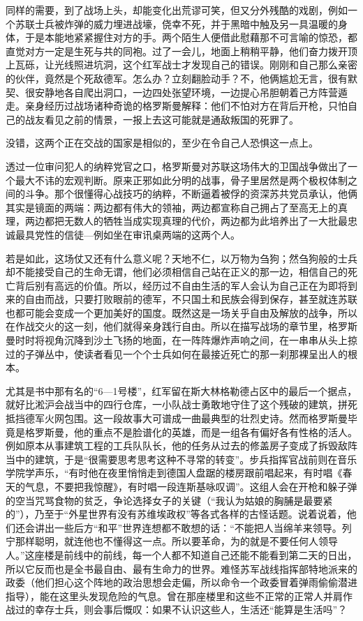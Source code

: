 同样的需要，到了战场上头，却能变化出荒谬可笑，但又分外残酷的戏剧，例如一个苏联士兵被炸弹的威力埋进战壕，侥幸不死，并于黑暗中触及另一具温暖的身体，于是本能地紧紧握住对方的手。两个陌生人便借此慰藉那不可言喻的惊恐，都直觉对方一定是生死与共的同袍。过了一会儿，地面上稍稍平静，他们奋力拨开顶上瓦砾，让光线照进坑洞，这个红军战士才发现自己的错误。刚刚和自己那么亲密的伙伴，竟然是个死敌德军。怎么办？立刻翻脸动手？不，他俩尴尬无言，很有默契、很安静地各自爬出洞口，一边四处张望环境，一边提心吊胆朝着己方阵营遁走。亲身经历过战场诸种奇诡的格罗斯曼解释：他们不怕对方在背后开枪，只怕自己的战友看见之前的情景，一报上去这可能就是通敌叛国的死罪了。

没错，这两个正在交战的国家是相似的，至少在令自己人恐惧这一点上。

透过一位审问犯人的纳粹党官之口，格罗斯曼对苏联这场伟大的卫国战争做出了一个最大不讳的宏观判断。原来正邪如此分明的战事，骨子里居然是两个极权体制之间的斗争。那个很懂得心战技巧的纳粹，不断逼着被俘的资深苏共党员承认，他俩其实是镜面的两端：两边都有伟大的领袖，两边都宣称自己拥占了至高无上的真理，两边都把无数人的牺牲当成实现真理的代价，两边都为此培养出了一大批最忠诚最具党性的信徒—例如坐在审讯桌两端的这两个人。

若是如此，这场仗又还有什么意义呢？天地不仁，以万物为刍狗；然刍狗般的士兵却不能接受自己的生命无谓，他们必须相信自己站在正义的那一边，相信自己的死亡背后别有高远的价值。所以，经历过不自由生活的军人会认为自己正在为即将到来的自由而战，只要打败眼前的德军，不只国土和民族会得到保存，甚至就连苏联也都可能会变成一个更加美好的国度。既然这是一场关乎自由及解放的战争，所以在作战交火的这一刻，他们就得亲身践行自由。所以在描写战场的章节里，格罗斯曼时时将视角沉降到沙土飞扬的地面，在一阵阵爆炸声响之间，在一串串从头上掠过的子弹丛中，使读者看见一个个士兵如何在最接近死亡的那一刹那裸呈出人的根本。

尤其是书中那有名的“6—1号楼”，红军留在斯大林格勒德占区中的最后一个据点，就好比淞沪会战当中的四行仓库，一小队战士勇敢地守住了这个残破的建筑，拼死抵挡德军火网包围。这一段故事大可谱成一曲最典型的壮烈史诗。然而格罗斯曼毕竟是格罗斯曼，他的重点不是脸谱化的英雄，而是一组各有偏好各有性格的活人。例如原本从事建筑工程的工兵队队长，他的任务从过去的修盖房子变成了拆毁敌阵当中的建筑，于是“很需要思考思考这种不寻常的转变”。步兵指挥官战前则在音乐学院学声乐，“有时他在夜里悄悄走到德国人盘踞的楼房跟前唱起来，有时唱《春天的气息，不要把我惊醒》，有时唱一段连斯基咏叹调”。这组人会在开枪和躲子弹的空当咒骂食物的贫乏，争论选择女子的关键（“我认为姑娘的胸脯是最要紧的”），乃至于“外星世界有没有苏维埃政权”等各式各样的古怪话题。说着说着，他们还会讲出一些后方“和平”世界连想都不敢想的话：“不能把人当绵羊来领导。列宁那样聪明，就连他也不懂得这一点。所以要革命，为的就是不要任何人领导人。”这座楼是前线中的前线，每一个人都不知道自己还能不能看到第二天的日出，所以它反而也是全书最自由、最有生命力的世界。难怪苏军战线指挥部特地派来的政委（他们担心这个阵地的政治思想会走偏，所以命令一个政委冒着弹雨偷偷潜进指导），能在这里头发现危险的气息。曾在那座楼里和这些不正常的正常人并肩作战过的幸存士兵，则会事后慨叹：如果不认识这些人，生活还“能算是生活吗”？

